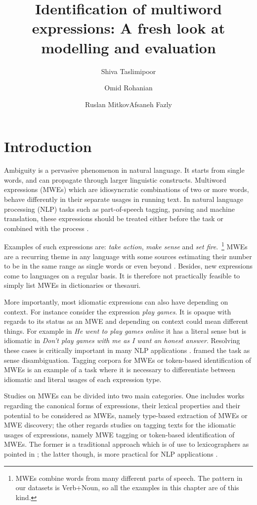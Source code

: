 \documentclass[output=paper,modfonts,nonflat]{langsci/langscibook}
\title{Identification of multiword expressions: A fresh look at modelling and evaluation}
\author{Shiva Taslimipoor\affiliation{University of Wolverhampton}\and  Omid Rohanian\affiliation{University of Wolverhampton}\and  Ruslan Mitkov\affiliation{University of Wolverhampton}\lastand Afsaneh Fazly\affiliation{Thomson Reuters}
}
\begin{document}
\maketitle
\label{TASLIMIPOOR-CHAPTER}

\section{Introduction} 

Ambiguity is a pervasive phenomenon in natural language. It starts from single words, and can propagate through larger linguistic constructs. Multiword expressions (MWEs) which are idiosyncratic combinations of two or more words, behave differently in their separate usages in running text. In natural language processing (NLP) tasks such as part-of-speech tagging, parsing and machine translation, these expressions should be treated either before the task \citep{nivre2004} or combined with the process \citep{constant2012evaluating,kordoni2011proceedings,nasr:acl:2015}. 

Examples of such expressions are: \textit{take action}, \textit{make sense} and \textit{set fire}.~\footnote{MWEs combine words from many different parts of speech. The pattern in our datasets is Verb+Noun, so all the examples in this chapter are of this kind.} 
MWEs are a recurring theme in any language with some sources estimating their number to be in the same range as single words \citep{Jac97} or even beyond \citep{Sag2002a}. Besides, new expressions come to languages on a regular basis. It is therefore not practically feasible to simply list MWEs in dictionaries or thesauri. 

More importantly, most idiomatic expressions can also have  depending on context.
For instance consider the expression \textit{play games}. It is opaque with regards to its status as an MWE and depending on context could mean different things. For example in \textit{He went to play games online} it has a literal sense but is idiomatic in \textit{Don’t play games with me as I want an honest answer}. Resolving these cases is critically important in many NLP applications \citep{Katz06automaticidentification}. \cite{Katz06automaticidentification} framed the task as sense disambiguation. Tagging corpora for MWEs or token-based identification of MWEs is an example of a task where it is necessary to differentiate between idiomatic and literal usages of each expression type. 

Studies on MWEs can be divided into two main categories. One includes works regarding the canonical forms of expressions, their lexical properties and their potential to be considered as MWEs, namely type-based extraction of MWEs or MWE discovery; the other regards studies on tagging texts for the idiomatic usages of expressions, namely MWE tagging or token-based identification of MWEs. The former is a traditional approach which is of use to lexicographers as pointed in \cite{ramisch2014multiword}; the latter though, is more practical for NLP applications \citep{schneider-dimsum:2016}.
\end{document}
